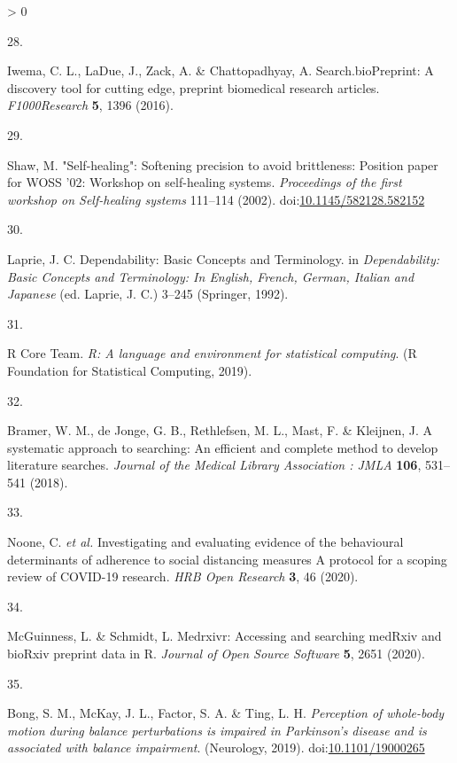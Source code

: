 \documentclass[a4paper, twoside]{templates/ociamthesis}
\newlength{\cslhangindent}
\newlength{\csllabelwidth}
\newenvironment{CSLReferences}[3] %
 {%
  \setlength{\parindent}{0pt}
  \ifodd #1 \everypar{\setlength{\hangindent}{\cslhangindent}}\ignorespaces\fi
  \ifnum #2 > 0
  \setlength{\parskip}{#2\baselineskip}
  \fi
 }%
 {}
\newcommand{\CSLLeftMargin}[1]{\parbox[t]{\maxof{\widthof{#1}}{\csllabelwidth}}{#1}}
\newcommand{\CSLRightInline}[1]{\parbox[t]{\linewidth - \csllabelwidth}{#1}}
\begin{document}
\begin{CSLReferences}{0}{0}
\leavevmode\hypertarget{ref-iwema2016}{}%
\CSLLeftMargin{28. }
\CSLRightInline{Iwema, C. L., LaDue, J., Zack, A. \& Chattopadhyay, A. Search.{bioPreprint}: A discovery tool for cutting edge, preprint biomedical research articles. \emph{F1000Research} \textbf{5}, 1396 (2016).}

\leavevmode\hypertarget{ref-shaw2002}{}%
\CSLLeftMargin{29. }
\CSLRightInline{Shaw, M. "{Self}-healing": Softening precision to avoid brittleness: Position paper for {WOSS} '02: Workshop on self-healing systems. \emph{Proceedings of the first workshop on Self-healing systems} 111--114 (2002). doi:\href{https://doi.org/10.1145/582128.582152}{10.1145/582128.582152}}

\leavevmode\hypertarget{ref-laprie1992}{}%
\CSLLeftMargin{30. }
\CSLRightInline{Laprie, J. C. Dependability: {Basic Concepts} and {Terminology}. in \emph{Dependability: {Basic Concepts} and {Terminology}: {In English}, {French}, {German}, {Italian} and {Japanese}} (ed. Laprie, J. C.) 3--245 ({Springer}, 1992).}

\leavevmode\hypertarget{ref-rcoreteam2019}{}%
\CSLLeftMargin{31. }
\CSLRightInline{R Core Team. \emph{R: {A} language and environment for statistical computing}. ({R Foundation for Statistical Computing}, 2019).}

\leavevmode\hypertarget{ref-bramer2018}{}%
\CSLLeftMargin{32. }
\CSLRightInline{Bramer, W. M., de Jonge, G. B., Rethlefsen, M. L., Mast, F. \& Kleijnen, J. A systematic approach to searching: An efficient and complete method to develop literature searches. \emph{Journal of the Medical Library Association : JMLA} \textbf{106}, 531--541 (2018).}

\leavevmode\hypertarget{ref-noone2020}{}%
\CSLLeftMargin{33. }
\CSLRightInline{Noone, C. \emph{et al.} Investigating and evaluating evidence of the behavioural determinants of adherence to social distancing measures {} {A} protocol for a scoping review of {COVID}-19 research. \emph{HRB Open Research} \textbf{3}, 46 (2020).}

\leavevmode\hypertarget{ref-mcguinness2020a}{}%
\CSLLeftMargin{34. }
\CSLRightInline{McGuinness, L. \& Schmidt, L. Medrxivr: {Accessing} and searching {medRxiv} and {bioRxiv} preprint data in {R}. \emph{Journal of Open Source Software} \textbf{5}, 2651 (2020).}

\leavevmode\hypertarget{ref-bong2019}{}%
\CSLLeftMargin{35. }
\CSLRightInline{Bong, S. M., McKay, J. L., Factor, S. A. \& Ting, L. H. \emph{Perception of whole-body motion during balance perturbations is impaired in {Parkinson}'s disease and is associated with balance impairment}. ({Neurology}, 2019). doi:\href{https://doi.org/10.1101/19000265}{10.1101/19000265}}


\end{CSLReferences}
\end{document}
